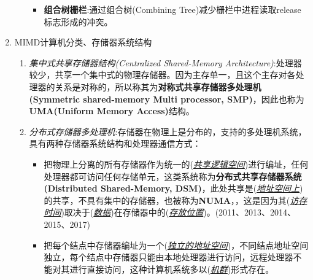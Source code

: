 \documentclass[a4paper]{ctexart}
\newcommand{\blank}[1]{(\emph{\underline{#1}})}
\begin{document}
\begin{enumerate}
\begin{enumerate}
\begin{itemize}
      \item \textbf{组合树栅栏}:通过组合树(Combining Tree)减少栅栏中进程读取release标志形成的冲突。
    \end{itemize}
  \end{enumerate}
  \item MIMD计算机分类、存储器系统结构
  \begin{enumerate}
    \item \emph{集中式共享存储器结构(Centralized Shared-Memory Architecture)}:处理器较少，共享一个集中式的物理存储器。因为主存单一，且这个主存对各处理器的关系是对称的，所以称其为\textbf{对称式共享存储器多处理机(Symmetric shared-memory Multi processor, SMP)}，因此也称为\textbf{UMA(Uniform Memory Access)}结构。
    \item \emph{分布式存储器多处理机}:存储器在物理上是分布的，支持的多处理机系统，具有两种存储器系统结构和处理器通信方式：
    \begin{itemize}
      \item 把物理上分离的所有存储器作为统一的\blank{共享逻辑空间}进行编址，任何处理器都可访问任何存储单元，这类系统称为\textbf{分布式共享存储器系统(Distributed Shared-Memory, DSM)}，此处共享是\blank{地址空间上}的共享，不具有集中的存储器，也被称为\textbf{NUMA}，，这是因为其\blank{访存时间}取决于\blank{数据}在存储器中的\blank{存放位置}。(2011、2013、2014、2015、2017)
      \item 把每个结点中存储器编址为一个\blank{独立的地址空间}，不同结点地址空间独立，每个结点中存储器只能由本地处理器进行访问，远程处理器不能对其进行直接访问，这种计算机系统多以\blank{机群}形式存在。
    \end{itemize}
  \end{enumerate}
\end{enumerate}
\end{document}
